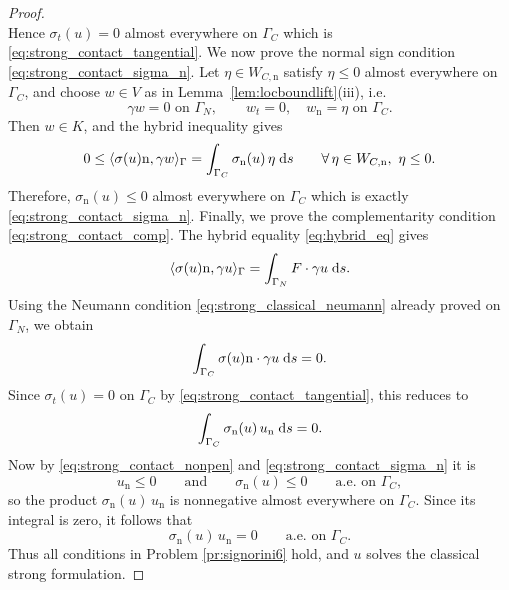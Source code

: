 \begin{proof}
\begin{equation*}
	\end{equation*}
	Hence $\sigma_t(u)=0$ almost everywhere on $\Gamma_C$ which is \eqref{eq:strong_contact_tangential}. We now prove the normal sign condition \eqref{eq:strong_contact_sigma_n}. Let $\eta\in W_{C,\mathrm n}$ satisfy $\eta\le 0$ almost everywhere on $\Gamma_C$, and choose $w\in V$ as in Lemma~\ref{lem:locboundlift}(iii), i.e.
	\begin{equation*}
		\gamma w=0 \text{ on }\Gamma_N,
		\qquad
		w_t=0,\quad w_{\mathrm n}=\eta \text{ on }\Gamma_C.
	\end{equation*}
	Then $w\in K$, and the hybrid inequality gives
	\begin{equation*}
		0
		\le
		\langle \sigma(u)\mathrm n,\gamma w\rangle_\Gamma
		=
		\int_{\Gamma_C} \sigma_{\mathrm n}(u)\,\eta\;{{\mathrm{d}} s}
		\qquad\forall\,\eta\in W_{C,\mathrm n},\ \eta\le 0.
	\end{equation*}
	Therefore, $\sigma_{\mathrm n}(u)\le 0$ almost everywhere on $\Gamma_C$ which is exactly \eqref{eq:strong_contact_sigma_n}. Finally, we prove the complementarity condition \eqref{eq:strong_contact_comp}. The hybrid equality \eqref{eq:hybrid_eq} gives
	\begin{equation*}
		\langle \sigma(u)\mathrm n,\gamma u\rangle_\Gamma
		=
		\int_{\Gamma_N} F\cdot \gamma u\;{{\mathrm{d}} s}.
	\end{equation*}
	Using the Neumann condition \eqref{eq:strong_classical_neumann} already proved on $\Gamma_N$, we obtain
	\begin{equation*}
		\int_{\Gamma_C} \sigma(u)\mathrm n\cdot \gamma u\;{{\mathrm{d}} s} = 0.
	\end{equation*}
	Since $\sigma_t(u)=0$ on $\Gamma_C$ by \eqref{eq:strong_contact_tangential}, this reduces to
	\begin{equation*}
		\int_{\Gamma_C} \sigma_{\mathrm n}(u)\,u_{\mathrm n}\;{{\mathrm{d}} s} = 0.
	\end{equation*}
	Now by \eqref{eq:strong_contact_nonpen} and \eqref{eq:strong_contact_sigma_n} it is
	\begin{equation*}
		u_{\mathrm n}\le 0
		\qquad\text{and}\qquad
		\sigma_{\mathrm n}(u)\le 0
		\qquad\text{a.e. on }\Gamma_C,
	\end{equation*}
	so the product $\sigma_{\mathrm n}(u)\,u_{\mathrm n}$ is nonnegative almost everywhere on $\Gamma_C$. Since its integral is zero, it follows that
	\begin{equation*}
		\sigma_{\mathrm n}(u)\,u_{\mathrm n}=0
		\qquad\text{a.e. on }\Gamma_C.
	\end{equation*}
	Thus all conditions in Problem \ref{pr:signorini6} hold, and $u$ solves the classical strong formulation.
\end{proof}

